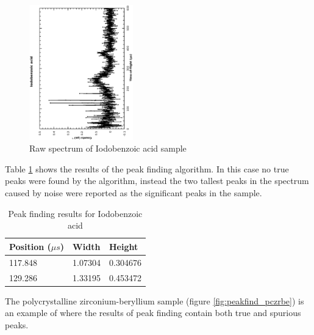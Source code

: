 \documentclass[a4paper]{article}
\begin{document}
\begin{figure}[h!]
  \centering
  \begin{turn}{-90}
    \includegraphics[width=0.4\textwidth]{graphics/peakfind_iodobenzoic_acid.eps}
  \end{turn}
  \caption{Raw spectrum of Iodobenzoic acid sample}
  \label{fig:peakfind_iodobenzoic_acid}
\end{figure}
\FloatBarrier

Table \ref{tab:peakfind_iodobenzoic_acid} shows the results of the peak finding
algorithm. In this case no true peaks were found by the algorithm, instead the
two tallest peaks in the spectrum caused by noise were reported as the
significant peaks in the sample.

\begin{table}[h!]
  \centering
  \begin{tabular}{@{}lll@{}}
    \toprule
    Position ($\mu s$) & Width   & Height \\
    \midrule
    117.848            & 1.07304 & 0.304676 \\
    129.286            & 1.33195 & 0.453472 \\
    \bottomrule
  \end{tabular}
  \caption{Peak finding results for Iodobenzoic acid}
  \label{tab:peakfind_iodobenzoic_acid}
\end{table}
\FloatBarrier

The polycrystalline zirconium-beryllium sample (figure
\ref{fig:peakfind_pczrbe}) is an example of where the results of peak finding
contain both true and spurious peaks.
\end{document}
